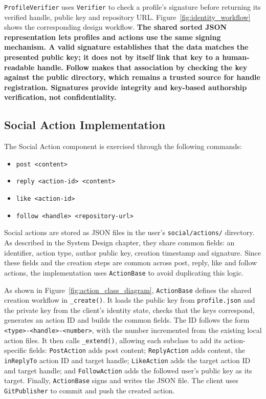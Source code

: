 \texttt{ProfileVerifier} uses \texttt{Verifier} to check a profile's
signature before returning its verified handle, public key and repository
URL. Figure~\ref{fig:identity_workflow} shows the corresponding design
workflow. \textbf{The shared sorted JSON representation lets profiles and
actions use the same signing mechanism. A valid signature establishes that
the data matches the presented public key; it does not by itself link that
key to a human-readable handle. Follow makes that association by checking
the key against the public directory, which remains a trusted source for
handle registration. Signatures provide integrity and key-based authorship
verification, not confidentiality.}

\subsection{Social Action Implementation}
The Social Action component is exercised through the following commands: 
\begin{itemize} 
    \item \texttt{post <content>} 
    \item \texttt{reply <action-id> <content>} 
    \item \texttt{like <action-id>} 
    \item \texttt{follow <handle> <repository-url>} 
\end{itemize}

Social actions are stored as JSON files in the user's
\texttt{social/actions/} directory. As described in the System Design
chapter, they share common fields: an identifier, action type, author public
key, creation timestamp and signature. Since these fields and the creation
steps are common across post, reply, like and follow actions, the
implementation uses \texttt{ActionBase} to avoid duplicating this logic.

As shown in Figure~\ref{fig:action_class_diagram},
\texttt{ActionBase} defines the shared creation workflow in
\texttt{\_create()}. It loads the public key from \texttt{profile.json} and
the private key from the client's identity state, checks that the keys
correspond, generates an action ID and builds the common fields. The
ID follows the form \texttt{<type>-<handle>-<number>}, with the number
incremented from the existing local action files. It then calls
\texttt{\_extend()}, allowing each subclass to add its action-specific
fields: \texttt{PostAction} adds post content; \texttt{ReplyAction} adds
content, the \texttt{inReplyTo} action ID and target handle;
\texttt{LikeAction} adds the target action ID and target handle; and
\texttt{FollowAction} adds the followed user's public key as its target.
Finally, \texttt{ActionBase} signs and writes the JSON file. The client uses
\texttt{GitPublisher} to commit and push the created action.

